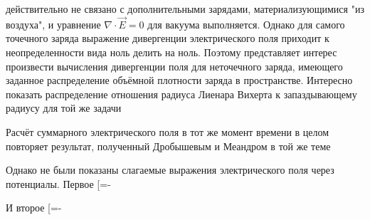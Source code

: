 \documentclass[11pt]{article}
\begin{document}
действительно не связано с дополнительными зарядами, материализующимися
"из воздуха", и уравнение \(\nabla\cdot\vec{E}=0\) для вакуума
выполняется. Однако для самого точечного заряда выражение дивергенции
электрического поля приходит к неопределенности вида ноль делить на
ноль. Поэтому представляет интерес произвести вычисления дивергенции
поля для неточечного заряда, имеющего заданное распределение объёмной
плотности заряда в пространстве. Интересно показать распределение
отношения радиуса Лиенара Вихерта к запаздывающему радиусу для той же
задачи

Расчёт суммарного электрического поля в тот же момент времени в целом
повторяет результат, полученный Дробышевым и Меандром в той же теме

Однако не были показаны слагаемые выражения электрического поля через
потенциалы. Первое {[}=-\nabla \varphi {]}

И второе
{[}=-\frac{\partial \overrightarrow{A}}{\partial t}{]}
\end{document}
